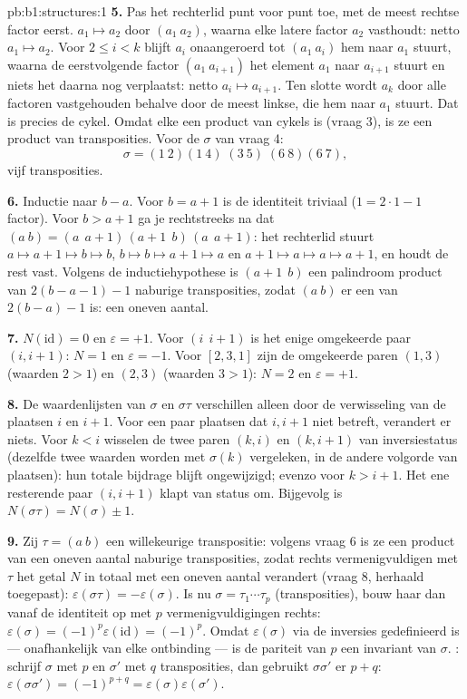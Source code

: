\begin{solution}{pb:b1:structures:1}
\textbf{5.} Pas het rechterlid punt voor punt toe, met de meest rechtse
factor eerst. $a_1 \mapsto a_2$ door $(a_1\ a_2)$, waarna elke latere
factor $a_2$ vasthoudt: netto $a_1 \mapsto a_2$. Voor $2 \leq i < k$
blijft $a_i$ onaangeroerd tot $(a_1\ a_i)$ hem naar $a_1$ stuurt, waarna
de eerstvolgende factor $(a_1\ a_{i+1})$ het element $a_1$ naar $a_{i+1}$
stuurt en niets het daarna nog verplaatst: netto $a_i \mapsto a_{i+1}$.
Ten slotte wordt $a_k$ door alle factoren vastgehouden behalve door de
meest linkse, die hem naar $a_1$ stuurt. Dat is precies de cykel. Omdat
elke  een product van cykels is (vraag 3), is ze een product van
transposities. Voor de $\sigma$ van vraag 4:
\[
\sigma = (1\ 2)(1\ 4)\;(3\ 5)\;(6\ 8)(6\ 7),
\]
vijf transposities.

\textbf{6.} Inductie naar $b - a$. Voor $b = a + 1$ is de identiteit
triviaal ($1 = 2\cdot1 - 1$ factor). Voor $b > a + 1$ ga je rechtstreeks
na dat $(a\ b) = (a\ \ a{+}1)\,(a{+}1\ \ b)\,(a\ \ a{+}1)$: het
rechterlid stuurt $a \mapsto a{+}1 \mapsto b \mapsto b$, $b \mapsto b
\mapsto a{+}1 \mapsto a$ en $a{+}1 \mapsto a \mapsto a \mapsto a{+}1$, en
houdt de rest vast. Volgens de inductiehypothese is $(a{+}1\ \ b)$ een
palindroom product van $2(b - a - 1) - 1$ naburige transposities, zodat
$(a\ b)$ er een van $2(b - a) - 1$ is: een oneven aantal.

\textbf{7.} $N(\mathrm{id}) = 0$ en $\varepsilon = +1$. Voor $(i\ \
i{+}1)$ is het enige omgekeerde paar $(i, i+1)$: $N = 1$ en $\varepsilon =
-1$. Voor $[2, 3, 1]$ zijn de omgekeerde paren $(1, 3)$ (waarden $2 > 1$)
en $(2, 3)$ (waarden $3 > 1$): $N = 2$ en $\varepsilon = +1$.

\textbf{8.} De waardenlijsten van $\sigma$ en $\sigma\tau$ verschillen
alleen door de verwisseling van de plaatsen $i$ en $i + 1$. Voor een paar
plaatsen dat $i, i+1$ niet betreft, verandert er niets. Voor $k < i$
wisselen de twee paren $(k, i)$ en $(k, i+1)$ van inversiestatus (dezelfde
twee waarden worden met $\sigma(k)$ vergeleken, in de andere volgorde van
plaatsen): hun totale bijdrage blijft ongewijzigd; evenzo voor $k > i +
1$. Het ene resterende paar $(i, i+1)$ klapt van status om. Bijgevolg is
$N(\sigma\tau) = N(\sigma) \pm 1$.

\textbf{9.} Zij $\tau = (a\ b)$ een willekeurige transpositie: volgens
vraag 6 is ze een product van een oneven aantal naburige transposities,
zodat rechts vermenigvuldigen met $\tau$ het getal $N$ in totaal met een
oneven aantal verandert (vraag 8, herhaald toegepast):
$\varepsilon(\sigma \tau) = -\varepsilon(\sigma)$. Is nu $\sigma =
\tau_1\cdots \tau_p$ (transposities), bouw haar dan vanaf de identiteit op
met $p$ vermenigvuldigingen rechts: $\varepsilon(\sigma) =
(-1)^p\varepsilon(\mathrm{id}) = (-1)^p$. Omdat $\varepsilon(\sigma)$ via
de inversies gedefinieerd is --- onafhankelijk van elke ontbinding --- is
de pariteit van $p$ een invariant van $\sigma$. : schrijf $\sigma$
met $p$ en $\sigma'$ met $q$ transposities, dan gebruikt $\sigma\sigma'$
er $p + q$: $\varepsilon(\sigma\sigma') = (-1)^{p+q} =
\varepsilon(\sigma)\varepsilon(\sigma')$.


\end{solution}
